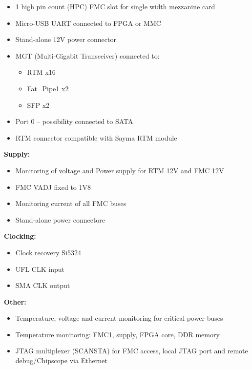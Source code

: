 \begin{itemize}
	\item 1 high pin count (HPC) FMC slot for single width mezzanine card
	\item Micro-USB UART connected to FPGA or MMC
	\item Stand-alone 12V power connector 
	\item MGT (Multi-Gigabit Transceiver) connected to:
	\begin{itemize}
		\item RTM x16
		\item Fat\_Pipe1 x2
		\item SFP x2
	\end{itemize}
	\item  Port 0 – possibility connected to SATA
	\item RTM connector compatible with Sayma RTM module
	
\end{itemize}

\textbf{Supply:}

\begin{itemize}
	\item Monitoring of voltage and Power supply for RTM 12V and FMC 12V
	\item FMC VADJ fixed to 1V8
	\item Monitoring current of all FMC buses
	\item Stand-alone power connectore
	
\end{itemize}


\textbf{Clocking:}

\begin{itemize}
	\item Clock recovery Si5324
	\item UFL CLK input
	\item SMA CLK output
 
	
\end{itemize}


\textbf{Other:}

\begin{itemize}
	\item Temperature, voltage and current monitoring for critical power buses
	\item Temperature monitoring: FMC1, supply, FPGA core, DDR memory
	\item JTAG multiplexer (SCANSTA) for FMC access, local JTAG port and remote debug/Chipscope via Ethernet
	
\end{itemize}








